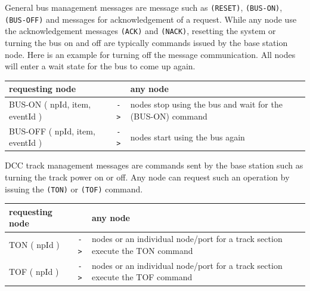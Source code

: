 
General bus management messages are message such as \texttt{(RESET)}, \texttt{(BUS-ON)}, \texttt{(BUS-OFF)} and messages for acknowledgement of a request. While any node use the acknowledgement messages \texttt{(ACK)} and \texttt{(NACK)}, resetting the system or turning the bus on and off are typically commands issued by the base station node. Here is an example for turning off the message communication. All nodes will enter a wait state for the bus to come up again.

\begin{table}[ht!]
    \begin{center}
        \begin{tabular}{|p{}| c |p{}|}
            \toprule
            \textbf{requesting node} & & \textbf{ any node} \\
            \midrule
            BUS-ON ( npId, item, eventId ) & \texttt{->} & nodes stop using the bus and wait for the (BUS-ON) command  \\
            \midrule
            BUS-OFF ( npId, item, eventId ) & \texttt{->} & nodes start using the bus again \\
            \bottomrule
        \end{tabular}
    \end{center}
\end{table}


DCC track management messages are commands sent by the base station such as turning the track power on or off. Any node can request such an operation by issuing the \texttt{(TON)} or \texttt{(TOF)} command.

\begin{table}[ht!]
    \begin{center}
        \begin{tabular}{|p{}| c |p{}|}
            \toprule
            \textbf{requesting node} & & \textbf{ any node} \\
            \midrule
            TON ( npId ) & \texttt{->} & nodes or an individual node/port for a track section execute the TON command  \\
            \midrule
            TOF ( npId ) & \texttt{->} & nodes or an individual node/port for a track section execute the TOF command \\
            \bottomrule
        \end{tabular}
    \end{center}
\end{table}

